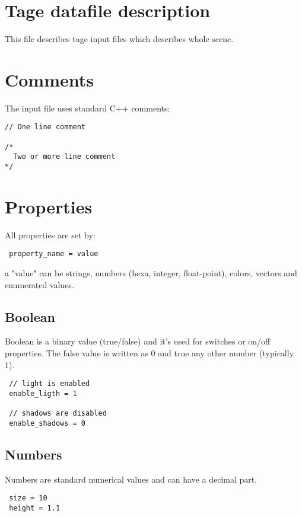 \documentclass[9pt]{article}
\begin{document}
\section{Tage datafile description}

This file describes tage input files which describes whole scene.

\section{Comments}

The input file uses standard C++ comments:

\begin{verbatim}
// One line comment

/*
  Two or more line comment
*/
\end{verbatim}

\section{Properties}

All properties are set by:

\begin{verbatim}
 property_name = value
\end{verbatim}

a "value" can be strings, numbers (hexa, integer, float-point), colors, vectors
and enumerated values.

\subsection{Boolean}

Boolean is a binary value (true/false) and it's used for switches
or on/off properties. The false value is written as 0 and true any other
number (typically 1).

\begin{verbatim}
 // light is enabled 
 enable_ligth = 1
 
 // shadows are disabled
 enable_shadows = 0
\end{verbatim}

\subsection{Numbers}

Numbers are standard numerical values and can have a decimal part.

\begin{verbatim}
 size = 10
 height = 1.1
\end{verbatim}
\end{document}
